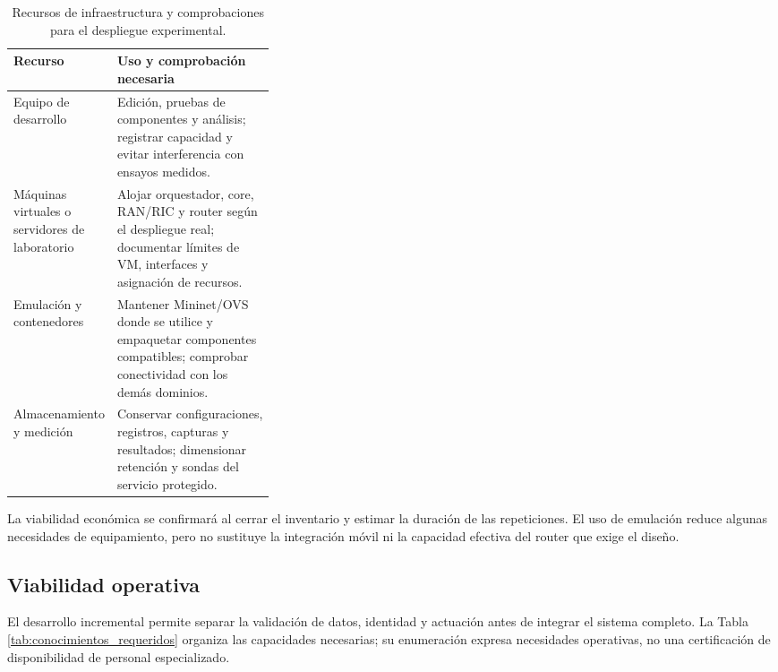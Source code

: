 \begin{table}[H]
    \centering
    \renewcommand{\arraystretch}{1.25}
    \fontsize{10}{12}\selectfont
    \begin{tabular}{@{}>{\raggedright\arraybackslash}p{0.34\linewidth}
        >{\raggedright\arraybackslash}p{}@{}}
        \hline \textbf{Recurso} & \textbf{Uso y comprobación necesaria} \\ \hline
        Equipo de desarrollo & Edición, pruebas de componentes y análisis; registrar capacidad y evitar interferencia con ensayos medidos. \\ \hline
        Máquinas virtuales o servidores de laboratorio & Alojar orquestador, core, RAN/RIC y router según el despliegue real; documentar límites de VM, interfaces y asignación de recursos. \\ \hline
        Emulación y contenedores & Mantener Mininet/OVS donde se utilice y empaquetar componentes compatibles; comprobar conectividad con los demás dominios. \\ \hline
        Almacenamiento y medición & Conservar configuraciones, registros, capturas y resultados; dimensionar retención y sondas del servicio protegido. \\ \hline
    \end{tabular}
    \caption{Recursos de infraestructura y comprobaciones para el despliegue experimental.}
    \label{tab:opciones_infraestructura}
\end{table}

La viabilidad económica se confirmará al cerrar el inventario y estimar la duración de las repeticiones. El uso de emulación reduce algunas necesidades de equipamiento, pero no sustituye la integración móvil ni la capacidad efectiva del router que exige el diseño.

\subsection{Viabilidad operativa}

El desarrollo incremental permite separar la validación de datos, identidad y actuación antes de integrar el sistema completo. La Tabla \ref{tab:conocimientos_requeridos} organiza las capacidades necesarias; su enumeración expresa necesidades operativas, no una certificación de disponibilidad de personal especializado.


